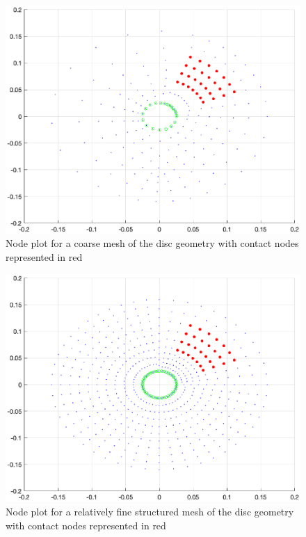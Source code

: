 \begin{figure}
    \centering
    \includegraphics[scale=0.43]{Chapter2/Pictures/Geo_pub_h1.eps}
    \caption{Node plot for a coarse mesh of the disc geometry with contact nodes represented in red}
    \label{fig:coarse_mesh}
\end{figure}

\begin{figure}
    \centering
    \includegraphics[scale=0.43]{Chapter2/Pictures/Geo_pub_h.eps}
    \caption{ Node plot for a relatively fine structured mesh of the disc geometry with contact nodes represented in red}
    \label{fig:h_mesh}
\end{figure}

